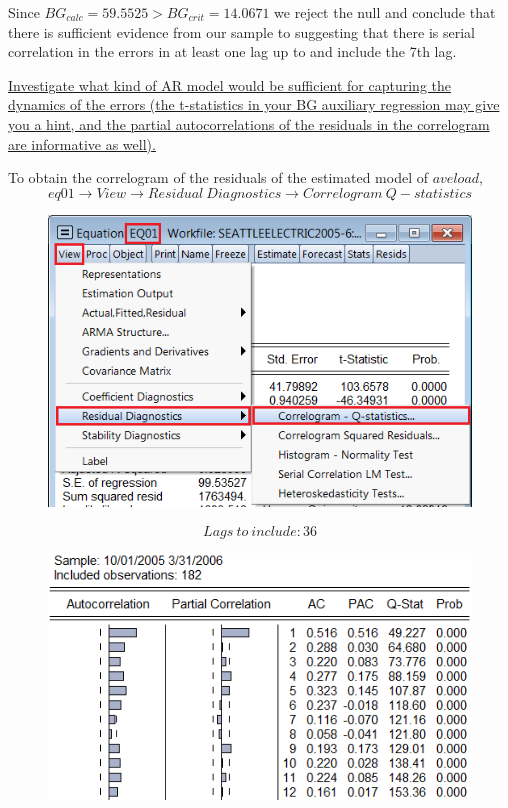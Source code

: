 \documentclass[12pt]{report}
\begin{document}
\noindent Since $BG_{calc}= 59.5525 > BG_{crit} = 14.0671$ we reject the null and conclude that there is sufficient evidence from our sample to suggesting that there is serial correlation in the errors in at least one lag up to and include the 7th lag.

\noindent \uline{Investigate what kind of AR model would be sufficient for capturing the dynamics of the errors (the t-statistics in your BG auxiliary regression may give you a hint, and the partial autocorrelations of the residuals in the correlogram are informative as well).}

\noindent To obtain the correlogram of the residuals of the estimated model of $aveload$, $$eq01 \to View \to Residual\ Diagnostics \to Correlogram\ Q-statistics$$
\begin{figure}[H]
	\centerline{\includegraphics{tute10_10}}
\end{figure}
\vspace{-\baselineskip}$$Lags\ to\ include:36$$

\begin{figure}[H]
	\centerline{\includegraphics{tute10_9}}
\end{figure}
\vspace{-\baselineskip}
\end{document}
